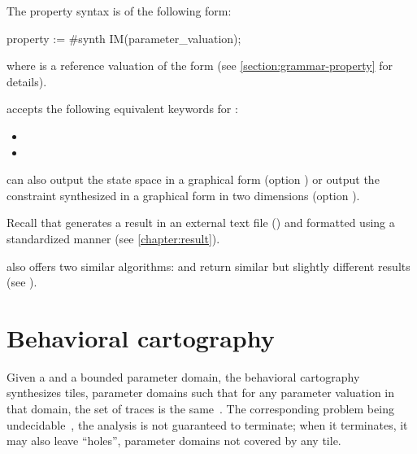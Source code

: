 The property syntax is of the following form:

\begin{IMITATORproperty}
property := #synth IM(parameter_valuation);
\end{IMITATORproperty}

\noindent{}
where  is a reference valuation of the form  (see \cref{section:grammar-property} for details).

\begin{syntaxalias}
	\imitator{} accepts the following equivalent keywords for :
	\begin{itemize}
		\item {}
		\item {}
	\end{itemize}
\end{syntaxalias}


\imitator{} can also output the state space in a graphical form (option )
or
output the constraint synthesized in a graphical form in two dimensions (option ).

Recall that \imitator{} %
generates
a result in an external text file () and formatted using a standardized manner (see \cref{chapter:result}). %


\imitator{} also offers two similar algorithms:  and  return similar but slightly different results (see \cite{AS11}).


\section{Behavioral cartography}\label{ss:mode:BC}

Given a \NIPTA{} and a bounded parameter domain, the behavioral cartography~\BC{} synthesizes tiles, \ie{} parameter domains such that for any parameter valuation in that domain, the set of traces is the same~\cite{AF10}.
The corresponding problem being undecidable~\cite{ALM20}, the analysis is not guaranteed to terminate; when it terminates, it may also leave ``holes'', \ie{} parameter domains not covered by any tile.

